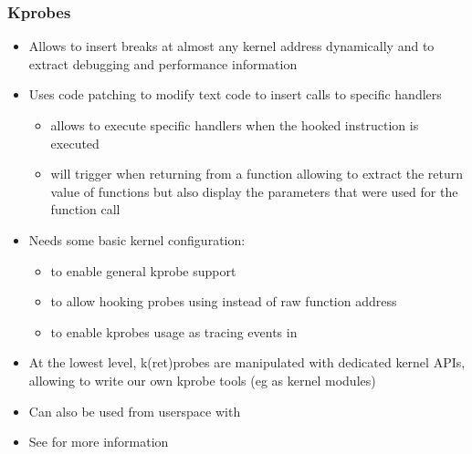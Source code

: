 \begin{frame}[fragile]
  \frametitle{Kprobes}
  \begin{itemize}
    \item Allows to insert breaks at almost any kernel address
          dynamically and to extract debugging and performance
          information
    \item Uses code patching to modify text code to insert calls to specific
          handlers
    \begin{itemize}
      \item {} allows to execute specific handlers when the hooked
            instruction is executed
      \item {} will trigger when returning from a function allowing to
            extract the return value of functions but also display the
            parameters that were used for the function call
    \end{itemize}
    \item Needs some basic kernel configuration:
	    \begin{itemize}
		    \item {} to enable general
			    kprobe support
		    \item {} to allow
			    hooking probes using 
			    instead of raw function address
		    \item {} to enable
			    kprobes usage as tracing events in
	    \end{itemize}
    \item At the lowest level, k(ret)probes are manipulated with dedicated
	    kernel APIs, allowing to write our own kprobe tools (eg as
	    kernel modules)
    \item Can also be used from userspace with
    \item See  for more information
  \end{itemize}
\end{frame}

